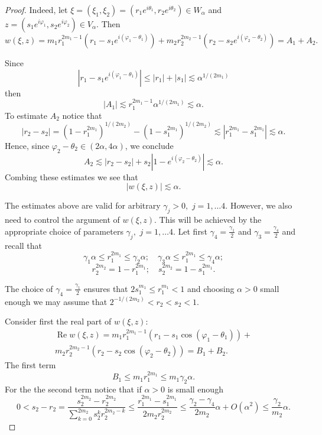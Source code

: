 \documentclass[10pt,a4paper]{amsart}
\newcommand{\RE}{ \mathop{\mathrm{Re}} }
\newcommand{\abs}[1]{\left\vert #1 \right\vert}
\begin{document}
\begin{proof} 
	Indeed, let $\xi=(\xi_1,\xi_2) =(r_1e^{i\theta_1},r_2e^{i\theta_2}) \in W_\alpha$ and $z = (s_1e^{i\varphi_1},s_2e^{i\varphi_2}) \in V_\alpha$. Then
	$$w(\xi,z) = m_1r_1^{2m_1-1}\left(r_1-s_1e^{i(\varphi_1-\theta_1)}\right) + m_2r_2^{2m_2-1}\left(r_2-s_2e^{i(\varphi_2-\theta_2)}\right)  =  A_1 + A_2.$$
	
	Since
	$$\abs{ r_1-s_1e^{i(\varphi_1-\theta_1)} }\leq \abs{r_1}+\abs{s_1} \lesssim \alpha^{1/(2m_1)}
	$$
	then
	$$\abs{A_1}\lesssim r_1^{2m_1-1}\alpha^{1/(2m_1)} \lesssim \alpha.$$
	To estimate $A_2$ notice that
	$$\abs{r_2-s_2}=(1-r_1^{2m_1})^{1/(2m_2)} - (1-s_1^{2m_1})^{1/(2m_2)} \lesssim \abs{ r_1^{2m_1} -s_1^{2m_1} } \lesssim \alpha.$$
	Hence, since $\varphi_2-\theta_2\in (2\alpha,4\alpha)$, we conclude 
	$$A_2 \lesssim \abs{r_2-s_2}+s_2\abs{1-e^{i(\varphi_2-\theta_2)} }\lesssim \alpha.$$
	Combing these estimates we see that 
	$$\abs{w(\xi,z)} \lesssim \alpha.$$
	
	The estimates above are valid for arbitrary $\gamma_j>0,$ $j=1,\ldots4.$ However, we also need to control the argument of $w(\xi,z).$ This will be achieved by the appropriate choice of parameters $\gamma_j,$ $j=1,\ldots4.$ Let first $\gamma_4=\frac{\gamma_1}{2}$ and $\gamma_{3} =\frac{\gamma_{4}}{2}$ and recall that
	$$ \gamma_1\alpha \leq r_1^{2m_1} \leq \gamma_2\alpha; \quad  \gamma_3\alpha \leq r_1^{2m_1} \leq \gamma_4\alpha ;$$
	$$r_2^{2m_2} = 1-r_1^{2m_1};\quad s_2^{2m_2} =  1-s_1^{2m_1}.$$

	
	The choice of $\gamma_4=\frac{\gamma_1}{2}$ ensures that $2s_1^{m_1}\leq  r_1^{m_1}<1$ and choosing $\alpha>0$ small enough we may assume that $2^{-1/(2m_2)}<r_2<s_2< 1.$
	
	
	Consider first the real part of $w(\xi,z)$:
	\begin{multline} \label{lm:EstOfKernel_REw}
		\RE w(\xi,z) = m_1 r_1^{2m_1-1} \left(r_1-s_1\cos(\varphi_1-\theta_1)\right)+\\
		m_2 r_2^{2m_2-1} \left(r_2-s_2\cos(\varphi_2-\theta_2)\right) = B_1+B_2.
	\end{multline}
	The first term 
	$$B_1\leq m_1 r_1^{2m_1} \leq m_1 \gamma_2 \alpha.$$
	For the the second term notice that if $\alpha>0$ is small enough
	\begin{equation} \label{eq2}
		0<s_2-r_2= \frac{ s_2^{2m_2}-r_2^{2m_2} }{ \sum\limits_{k=0}^{2m_2} s_2^k r_2^{2m_2-k} } \leq 
		\frac{ r_1^{2m_1} - s_1^{2m_1} }{ 2m_2 r_2^{2m_2} } \leq \frac{ \gamma_2 -\gamma_4 }{ 2 m_2 }  \alpha + O(\alpha^2)
		\leq\frac{ \gamma_2 }{ m_2 } \alpha.
	\end{equation}
	

\end{proof}
\end{document}
